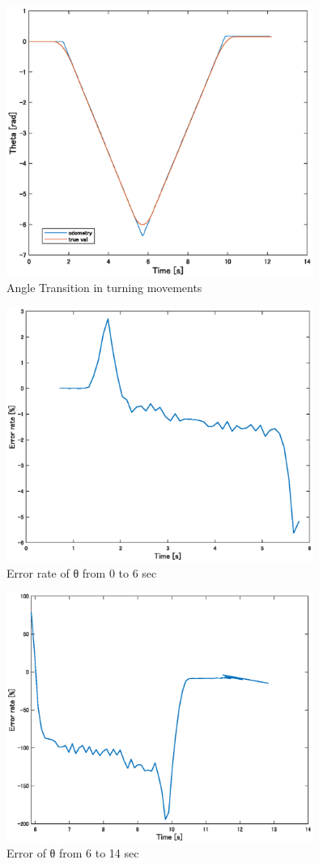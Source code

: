 \documentclass[a4paper,11pt]{jsarticle}
\begin{document}
\begin{figure}[H]\centering
\includegraphics[width=100mm]{figure/2_2.eps}
\caption{Angle Transition in turning movements}
\label{ex2_2}\vspace{0zh}\end{figure}


\begin{figure}[H]\centering
\includegraphics[width=100mm]{figure/2_5_1_te.eps}
\caption{Error rate of θ from 0 to 6 sec}
\label{ex2_5_1}\vspace{0zh}\end{figure}

\begin{figure}[H]\centering
\includegraphics[width=100mm]{figure/2_5_2_te.eps}
\caption{Error of θ from 6 to 14 sec}
\label{ex2_5_2}\vspace{0zh}\end{figure}
\end{document}
